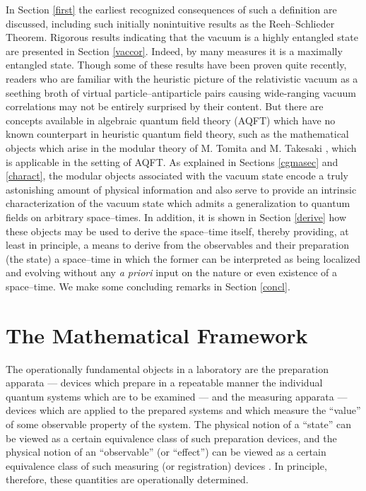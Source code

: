 \documentclass[12pt]{article}
\begin{document}
     In Section \ref{first} the earliest recognized consequences of
such a definition are discussed, including such initially nonintuitive
results as the Reeh--Schlieder Theorem. Rigorous results indicating
that the vacuum is a highly entangled state are presented in Section
\ref{vaccor}. Indeed, by many measures it is a maximally entangled
state. Though some of these results have been proven quite recently,
readers who are familiar with the heuristic picture of the
relativistic vacuum as a seething broth of virtual
particle--antiparticle pairs causing wide-ranging vacuum correlations
may not be entirely surprised by their content. But there are concepts
available in algebraic quantum field theory (AQFT) which have no known
counterpart in heuristic quantum field theory, such as the
mathematical objects which arise in the modular theory of M. Tomita
and M. Takesaki \cite{Takm}, which is applicable in the setting of
AQFT. As explained in Sections \ref{cgmasec} and \ref{charact}, the
modular objects associated with the vacuum state encode a truly
astonishing amount of physical information and also serve to provide
an intrinsic characterization of the vacuum state which admits a
generalization to quantum fields on arbitrary space--times. In
addition, it is shown in Section \ref{derive} how these objects may be
used to derive the space--time itself, thereby providing, at least in
principle, a means to derive from the observables and their
preparation (the state) a space--time in which the former can be
interpreted as being localized and evolving without any {\it a priori}
input on the nature or even existence of a space--time.  We make some
concluding remarks in Section \ref{concl}.
     


\section{The Mathematical Framework} \label{frame}
     
     The operationally fundamental objects in a laboratory are the
preparation apparata --- devices which prepare in a repeatable manner
the individual quantum systems which are to be examined --- and the
measuring apparata --- devices which are applied to the prepared
systems and which measure the ``value'' of some observable property of
the system. The physical notion of a ``state'' can be viewed as a
certain equivalence class of such preparation devices, and the
physical notion of an ``observable'' (or ``effect'') can be
viewed as a certain equivalence class of such measuring (or
registration) devices \cite{Lud,Ar}. In principle,
therefore, these quantities are operationally determined.
\end{document}
